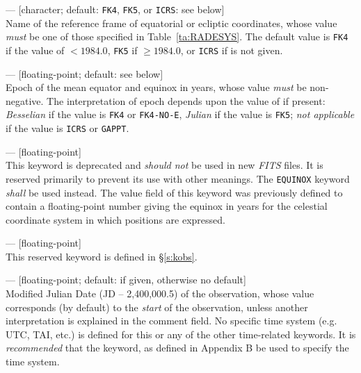 \documentclass[11pt,makeidx]{book}     %
\begin{document}
\begin{description}

\item {}  --- [character; default: \texttt{FK4}, \texttt{FK5}, or
\texttt{ICRS}: see below]\\ 
Name of the reference frame of equatorial or ecliptic
coordinates, whose value {\em must} be one of those specified in Table~\ref{ta:RADESYS}. The
default value is \texttt{FK4} if the value of  $<1984.0$,
\texttt{FK5} if  $\geq1984.0$, or \texttt{ICRS} if
 is not given.


\item {}  --- [floating-point; default: see below]\\ 
Epoch of the mean
equator and equinox in years, whose value {\em must} be non-negative. The
interpretation of epoch depends upon the value of  if present:
{\em Besselian} if the value is \texttt{FK4} or \texttt{FK4-NO-E}, {\em Julian}
if the value is \texttt{FK5}; {\em not applicable} if the value is \texttt{ICRS}
or \texttt{GAPPT}. 

\item {}  --- [floating-point]\\ 
  This keyword is deprecated  and {\em should not} be used in new 
  {\em FITS\/} files.  It is reserved primarily to prevent its use
  with other meanings.  The {\tt EQUINOX} keyword 
  {\em shall} be used instead.  The value field of this
  keyword was previously defined to contain a floating-point number
 giving the equinox in years for the celestial 
 coordinate system
 in which positions are expressed.


\item {}  --- [floating-point]\\
This reserved keyword is defined in \S\ref{s:kobs}. 

\item {}  --- [floating-point; default:  if given,
otherwise no default]\\ 
Modified Julian Date (JD -- 2,400,000.5) of the
observation, whose value corresponds (by default) to the {\em start} of the
observation, unless another interpretation is explained in the comment field. 
No specific time system (e.g. UTC, TAI, etc.) is defined for this or any of
the other time-related keywords.  It is {\em recommended} that 
the  keyword, as defined in Appendix B be used to specify the
time system.


\end{description}
\end{document}
